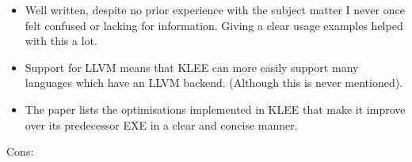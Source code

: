 \documentclass[11pt]{article}
\begin{document}
\begin{itemize}

    \item Well written, despite no prior experience with the subject matter I
    never once felt confused or lacking for information. Giving a clear usage
    examples helped with this a lot.

    \item Support for LLVM means that KLEE can more easily support many
    languages which have an LLVM backend. (Although this is never mentioned).


    \item The paper lists the optimisations implemented in KLEE that make it
    improve over its predecessor EXE \cite{EXE} in a clear and concise manner.

\end{itemize}

Cons:
\end{document}
